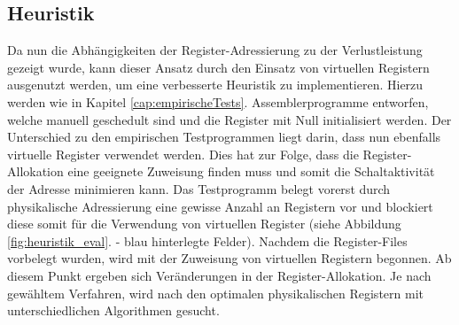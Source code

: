 \subsection{Heuristik}
\label{chap:eval_heuristik}
Da nun die Abhängigkeiten der Register-Adressierung zu der Verlustleistung gezeigt wurde, kann dieser Ansatz durch den Einsatz von virtuellen Registern ausgenutzt werden, um eine verbesserte Heuristik zu implementieren. Hierzu werden wie in Kapitel \ref{cap:empirischeTests}. Assemblerprogramme entworfen, welche manuell geschedult sind und die Register mit Null initialisiert werden. Der Unterschied zu den empirischen Testprogrammen liegt darin, dass nun ebenfalls virtuelle Register verwendet werden.
Dies hat zur Folge, dass die Register-Allokation eine geeignete Zuweisung finden muss und somit die Schaltaktivität der Adresse minimieren kann. Das Testprogramm belegt vorerst durch physikalische Adressierung eine gewisse Anzahl an Registern vor und blockiert diese somit für die Verwendung von virtuellen Register (siehe Abbildung \ref{fig:heuristik_eval}. - blau hinterlegte Felder).
Nachdem die Register-Files vorbelegt wurden, wird mit der Zuweisung von virtuellen Registern begonnen. Ab diesem Punkt ergeben sich Veränderungen in der Register-Allokation. Je nach gewähltem Verfahren, wird nach den optimalen physikalischen Registern mit unterschiedlichen Algorithmen gesucht. 


